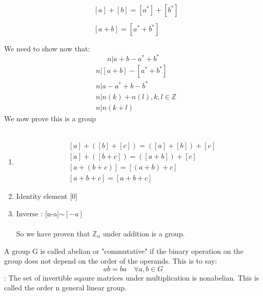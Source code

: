 \documentclass[11pt]{article}
\theoremstyle{definition}  %
\newcommand{\Z}{\mathbb{Z}}
\begin{document}
\begin{align*}
  &[a]+[b]=[a^*]+[b^*]\\\\
  &[a+b]=[a^*+b^*]\\\\
\end{align*}
We need to show now that:
\[
  n|a+b-a^*+b^*
\]
\begin{align*}
    &n|[a+b]-[a^*+b^*]\\
    &n|a-a^*+b-b^*\\
    &n|n(k)+n(l),k,l\in \Z\\
    &n|n(k+l)
\end{align*}
We now prove this is a group\\\\
\begin{enumerate}
  \item
  \begin{align*}
    &[a]+([b]+[c])=([a]+[b])+[c]\\
    &[a]+([b+c])=([a+b])+[c]\\
    &[a+(b+c)]=[(a+b)+c]\\
    &[a+b+c]=[a+b+c]
  \end{align*}
  \item Identity element [0]
  \item Inverse : [n-a]$\sim[-a]$\\\\
So we have proven that $\Z_n$ under addition is a group.
\end{enumerate}
 A group G is called abelian or "commutative" if the binary operation on the group does not depend on the order of the operands. This is to say:
\[
  ab=ba \quad \forall a,b \in G
\]
:
The set of invertible sqaure matrices under multiplication is nonabelian. This is called the order n general linear group.
\end{document}
